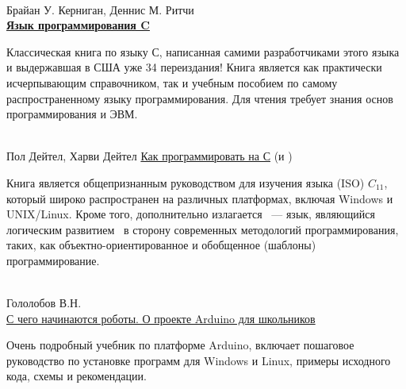 \begin{thebibliography}{99}

\clearpage

 \\
	Брайан У. Керниган, Деннис М. Ритчи\\
	\href{https://www.ozon.ru/context/detail/id/2480925/}{\textbf{Язык
	программирования C}}
	
Классическая книга по языку С, написанная самими разработчиками этого языка и
выдержавшая в США уже 34 переиздания! Книга является как практически
исчерпывающим справочником, так и учебным пособием по самому распространенному
языку программирования. Для чтения требует знания основ программирования и ЭВМ.

\clearpage

 \\
	Пол Дейтел, Харви Дейтел
	\href{https://www.ozon.ru/context/detail/id/24769512/}{Как программировать на
	С} (и \Cpp)
	
Книга является общепризнанным руководством для изучения языка (ISO) $C_{11}$,
который широко распространен на различных платформах, включая Windows и
UNIX/Linux. Кроме того, дополнительно излагается \Cpp\ --- язык, являющийся
логическим развитием \Ci\ в сторону современных методологий программирования,
таких, как объектно-ориентированное и обобщенное (шаблоны) программирование.

\clearpage

 \\
	Гололобов В.Н.\\
	\href{https://drive.google.com/open?id=1ctDWg_BTIIfJmy11MSw2ktIN0wblXter}{С
	чего начинаются роботы. О проекте Arduino для школьников}
	
Очень подробный учебник по платформе Arduino, включает пошаговое руководство по
установке программ для Windows и Linux, примеры исходного кода, схемы и
рекомендации.

\end{thebibliography}

